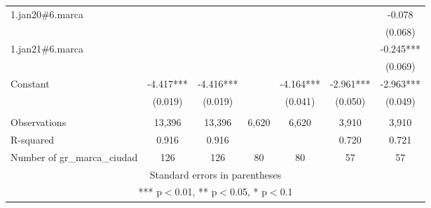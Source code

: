 \begin{tabular}{lcccccc}
1.jan20\#6.marca &  &  &  &  &  & -0.078 \\
 &  &  &  &  &  & (0.068) \\
1.jan21\#6.marca &  &  &  &  &  & -0.245*** \\
 &  &  &  &  &  & (0.069) \\
Constant & -4.417*** & -4.416*** &  & -4.164*** & -2.961*** & -2.963*** \\
 & (0.019) & (0.019) &  & (0.041) & (0.050) & (0.049) \\
 &  &  &  &  &  &  \\
Observations & 13,396 & 13,396 & 6,620 & 6,620 & 3,910 & 3,910 \\
R-squared & 0.916 & 0.916 &  &  & 0.720 & 0.721 \\
 Number of gr\_marca\_ciudad & 126 & 126 & 80 & 80 & 57 & 57 \\ \hline
\multicolumn{7}{c}{ Standard errors in parentheses} \\
\multicolumn{7}{c}{ *** p$<$0.01, ** p$<$0.05, * p$<$0.1} \\
\end{tabular}
